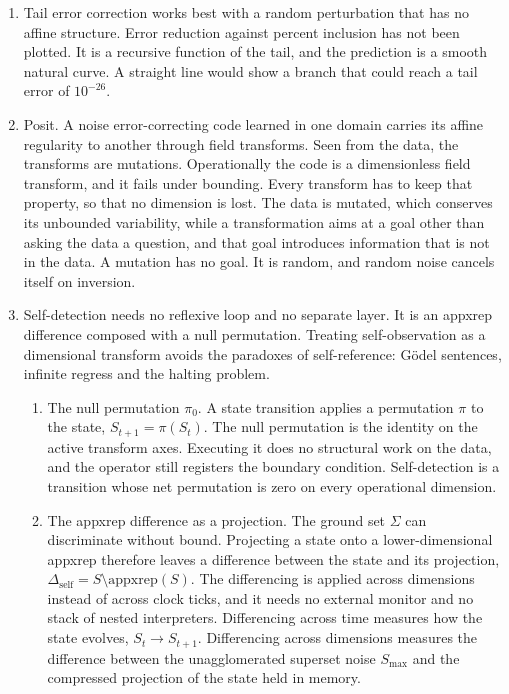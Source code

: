 \begin{enumerate}
\item Tail error correction works best with a random perturbation that has no affine structure. Error
reduction against percent inclusion has not been plotted. It is a recursive function of the tail, and
the prediction is a smooth natural curve. A straight line would show a branch that could reach a tail
error of $10^{-26}$.

\item Posit. A noise error-correcting code learned in one domain carries its affine regularity to
another through field transforms. Seen from the data, the transforms are mutations. Operationally the
code is a dimensionless field transform, and it fails under bounding. Every transform has to keep
that property, so that no dimension is lost. The data is mutated, which conserves its unbounded
variability, while a transformation aims at a goal other than asking the data a question, and that
goal introduces information that is not in the data. A mutation has no goal. It is random, and random
noise cancels itself on inversion.

\item Self-detection needs no reflexive loop and no separate layer. It is an appxrep difference
composed with a null permutation. Treating self-observation as a dimensional transform avoids the
paradoxes of self-reference: Gödel sentences, infinite regress and the halting problem.
\begin{enumerate}
\item The null permutation $\pi_0$. A state transition applies a permutation $\pi$ to the state,
$S_{t+1} = \pi(S_t)$. The null permutation is the identity on the active transform axes. Executing it
does no structural work on the data, and the operator still registers the boundary condition.
Self-detection is a transition whose net permutation is zero on every operational dimension.

\item The appxrep difference as a projection. The ground set $\Sigma$ can discriminate without bound.
Projecting a state onto a lower-dimensional appxrep therefore leaves a difference between the state and its
projection, $\Delta_{\mathrm{self}} = S \setminus \mathrm{appxrep}(S)$. The differencing is applied
across dimensions instead of across clock ticks, and it needs no external monitor and no stack of
nested interpreters. Differencing across time measures how the state evolves, $S_t \to S_{t+1}$.
Differencing across dimensions measures the difference between the unagglomerated superset noise
$S_{\max}$ and the compressed projection of the state held in memory.


\end{enumerate}
\end{enumerate}
